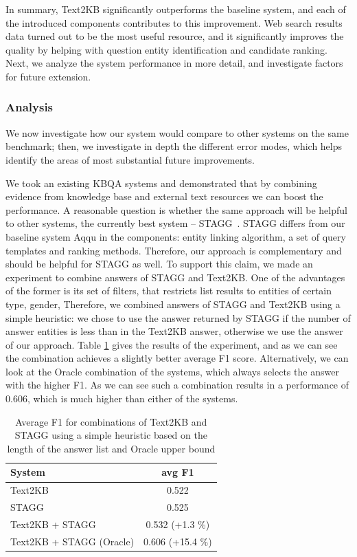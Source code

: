 In summary, Text2KB significantly outperforms the baseline system, and each of the introduced components contributes to this improvement.
Web search results data turned out to be the most useful resource, and it significantly improves the quality by helping with question entity identification and candidate ranking.
Next, we analyze the system performance in more detail, and investigate factors for future extension.

\subsubsection{Analysis}
\label{section:factoid:approaches:text2kb:analysis}

We now investigate how our system would compare to other systems on the same benchmark; then, we investigate in depth the different error modes, which helps identify the areas of most substantial future improvements.

We took an existing KBQA systems and demonstrated that by combining evidence from knowledge base and external text resources we can boost the performance.
A reasonable question is whether the same approach will be helpful to other systems, \eg the currently best system -- STAGG~\cite{yih:ACL:2015:STAGG}.
STAGG differs from our baseline system Aqqu in the components: entity linking algorithm, a set of query templates and ranking methods.
Therefore, our approach is complementary and should be helpful for STAGG as well.
To support this claim, we made an experiment to combine answers of STAGG and Text2KB.
One of the advantages of the former is its set of filters, that restricts list results to entities of certain type, gender, \etc
Therefore, we combined answers of STAGG and Text2KB using a simple heuristic: we chose to use the answer returned by STAGG if the number of answer entities is less than in the Text2KB answer, otherwise we use the answer of our approach.
Table \ref{table:text2kb:combine_stagg} gives the results of the experiment, and as we can see the combination achieves a slightly better average F1 score.
Alternatively, we can look at the Oracle combination of the systems, which always selects the answer with the higher F1.
As we can see such a combination results in a performance of 0.606, which is much higher than either of the systems.

\begin{table}
\centering
\begin{tabular}{| p{6cm} | c | }
\hline
System  & avg F1 \\
\hline
Text2KB & 0.522\\
\hline
STAGG~\cite{yih:ACL:2015:STAGG} & 0.525\\
Text2KB + STAGG & 0.532 (+1.3 \%) \\
Text2KB + STAGG (Oracle) & 0.606 (+15.4 \%) \\
\hline
\end{tabular}
\caption{Average F1 for combinations of Text2KB and STAGG using a simple heuristic based on the length of the answer list and Oracle upper bound}
\label{table:text2kb:combine_stagg}
\end{table}

